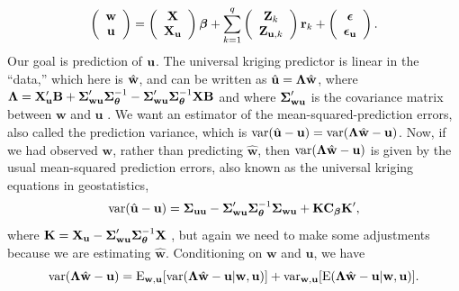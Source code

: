 \documentclass[12pt, titlepage]{article}
\begin{document}
\begin{equation} \label{eq:lm_4pred}
	\left( \begin{array}{c}
		\mathbf{w} \\
		\mathbf{u}{}
	\end{array} \right) = 
	\left( \begin{array}{c}
		\mathbf{X} \\
		\mathbf{X}_{\mathbf{u}}
	\end{array} \right) 
	\boldsymbol{\beta} + 
	\sum_{k=1}^{q}
	\left( \begin{array}{c}
		\mathbf{Z}_{k} \\
		\mathbf{Z}_{\mathbf{u},k}
	\end{array} \right)   
  \mathbf{r}_{k} + 
	\left( \begin{array}{c}
		\mbox{\boldmath $\epsilon$} \\
		\mbox{\boldmath $\epsilon$}_{\mathbf{u}}
	\end{array} \right).   
\end{equation}
Our goal is prediction of $\mathbf{u}$.   The universal kriging predictor is linear in the ``data,'' which here is $\hat{\mathbf{w}}$, and can be written as $\hat{\mathbf{u}} = \mbox{\boldmath $\Lambda$}\hat{\mathbf{w}}$, where $\mbox{\boldmath $\Lambda$} = \mathbf{X}^{\prime}_{\mathbf{u}}\mathbf{B} + \mbox{\boldmath $\Sigma$}^{\prime}_{\mathbf{w}\mathbf{u}}\mbox{\boldmath $\Sigma$}^{-1}_{\boldsymbol{\theta}} - \mbox{\boldmath $\Sigma$}^{\prime}_{\mathbf{w}\mathbf{u}}\mbox{\boldmath $\Sigma$}^{-1}_{\boldsymbol{\theta}}\mathbf{X}\mathbf{B}$ and where $\mbox{\boldmath $\Sigma$}^{\prime}_{\mathbf{w}\mathbf{u}}$ is the covariance matrix between $\mathbf{w}$ and $\mathbf{u}$ \citep[][p. 173]{Cressie1993StatisticsSpatialData}. We want an estimator of the mean-squared-prediction errors, also called the prediction variance, which is $\textrm{var}(\hat{\mathbf{u}} -\mathbf{u}) = \textrm{var}(\mbox{\boldmath $\Lambda$}\hat{\mathbf{w}} - \mathbf{u})$.  Now, if we had observed $\mathbf{w}$, rather than predicting $\hat{\mathbf{w}}$, then $\textrm{var}(\mbox{\boldmath $\Lambda$}\hat{\mathbf{w}} - \mathbf{u})$ is given by the usual mean-squared prediction errors, also known as the universal kriging equations in geostatistics,
\begin{equation} \label{eq:UK_MSPE}
\textrm{var}(\hat{\mathbf{u}} - \mathbf{u}) = \mbox{\boldmath $\Sigma$}_{\mathbf{u}\mathbf{u}} - \mbox{\boldmath $\Sigma$}_{\mathbf{w}\mathbf{u}}^{\prime}\mbox{\boldmath $\Sigma$}_{\boldsymbol{\theta}}^{-1}\mbox{\boldmath $\Sigma$}_{\mathbf{w}\mathbf{u}} + \mathbf{K}\mathbf{C}_{\boldsymbol{\beta}}\mathbf{K}^{\prime},
\end{equation}
where $\mathbf{K} = \mathbf{X}_{\mathbf{u}} - \mbox{\boldmath $\Sigma$}^{\prime}_{\mathbf{w}\mathbf{u}}\mbox{\boldmath $\Sigma$}^{-1}_{\boldsymbol{\theta}}\mathbf{X}$ \citep[][p. 173]{Cressie1993StatisticsSpatialData}, but again we need to make some adjustments because we are estimating $\hat{\mathbf{w}}$.  Conditioning on $\mathbf{w}$ and $\mathbf{u}$, we have
$$
\textrm{var}(\mbox{\boldmath $\Lambda$}\hat{\mathbf{w}}-\mathbf{u}) = \textrm{E}_{\mathbf{w},\mathbf{u}}[\textrm{var}(\mbox{\boldmath $\Lambda$}\hat{\mathbf{w}} -\mathbf{u}|\mathbf{w},\mathbf{u})] + \textrm{var}_{\mathbf{w},\mathbf{u}}[\textrm{E}(\mbox{\boldmath $\Lambda$}\hat{\mathbf{w}}-\mathbf{u}|\mathbf{w},\mathbf{u})].
$$
\end{document}

